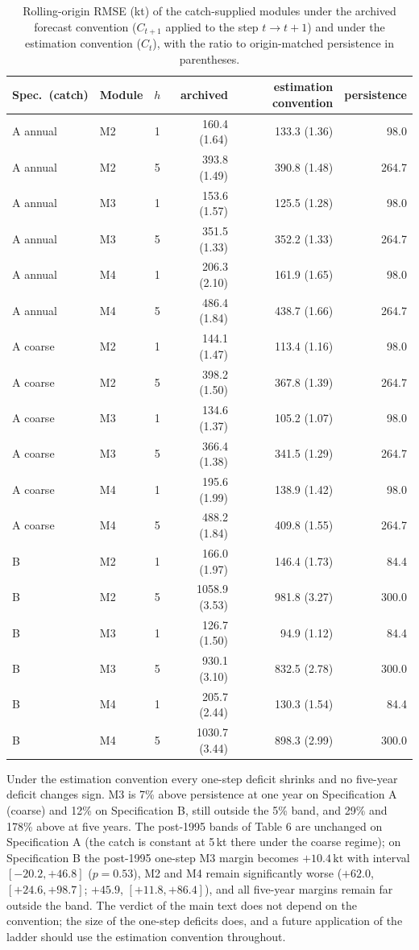 \documentclass[preprint,11pt,authoryear]{elsarticle}
\theoremstyle{remark}
\newcommand{\kt}{\,\mathrm{kt}}
\begin{document}
\begin{table}[!htb]
\centering\footnotesize\setlength{\tabcolsep}{3.5pt}
\caption{Rolling-origin RMSE (kt) of the catch-supplied modules under the archived forecast convention ($C_{t+1}$ applied to the step $t\to t+1$) and under the estimation convention ($C_t$), with the ratio to origin-matched persistence in parentheses.}
\label{tab:si_timing}
\begin{tabular}{@{}llcrrr@{}}
\toprule
Spec.\ (catch) & Module & $h$ & archived & estimation convention & persistence \\
\midrule
A annual & M2 & 1 & 160.4 (1.64) & 133.3 (1.36) & 98.0 \\
A annual & M2 & 5 & 393.8 (1.49) & 390.8 (1.48) & 264.7 \\
A annual & M3 & 1 & 153.6 (1.57) & 125.5 (1.28) & 98.0 \\
A annual & M3 & 5 & 351.5 (1.33) & 352.2 (1.33) & 264.7 \\
A annual & M4 & 1 & 206.3 (2.10) & 161.9 (1.65) & 98.0 \\
A annual & M4 & 5 & 486.4 (1.84) & 438.7 (1.66) & 264.7 \\
A coarse & M2 & 1 & 144.1 (1.47) & 113.4 (1.16) & 98.0 \\
A coarse & M2 & 5 & 398.2 (1.50) & 367.8 (1.39) & 264.7 \\
A coarse & M3 & 1 & 134.6 (1.37) & 105.2 (1.07) & 98.0 \\
A coarse & M3 & 5 & 366.4 (1.38) & 341.5 (1.29) & 264.7 \\
A coarse & M4 & 1 & 195.6 (1.99) & 138.9 (1.42) & 98.0 \\
A coarse & M4 & 5 & 488.2 (1.84) & 409.8 (1.55) & 264.7 \\
B & M2 & 1 & 166.0 (1.97) & 146.4 (1.73) & 84.4 \\
B & M2 & 5 & 1058.9 (3.53) & 981.8 (3.27) & 300.0 \\
B & M3 & 1 & 126.7 (1.50) & 94.9 (1.12) & 84.4 \\
B & M3 & 5 & 930.1 (3.10) & 832.5 (2.78) & 300.0 \\
B & M4 & 1 & 205.7 (2.44) & 130.3 (1.54) & 84.4 \\
B & M4 & 5 & 1030.7 (3.44) & 898.3 (2.99) & 300.0 \\
\bottomrule
\end{tabular}
\end{table}

Under the estimation convention every one-step deficit shrinks and no five-year deficit changes sign. M3 is 7\% above persistence at one year on Specification A (coarse) and 12\% on Specification B, still outside the 5\% band, and 29\% and 178\% above at five years. The post-1995 bands of Table 6 are unchanged on Specification A (the catch is constant at 5\,kt there under the coarse regime); on Specification B the post-1995 one-step M3 margin becomes $+10.4\kt$ with interval $[-20.2, +46.8]$ ($p = 0.53$), M2 and M4 remain significantly worse ($+62.0$, $[+24.6, +98.7]$; $+45.9$, $[+11.8, +86.4]$), and all five-year margins remain far outside the band. The verdict of the main text does not depend on the convention; the size of the one-step deficits does, and a future application of the ladder should use the estimation convention throughout.
\end{document}
